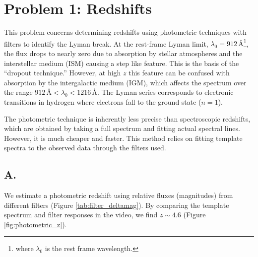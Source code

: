 
\section*{Problem 1: Redshifts}
This problem concerns determining redshifts using photometric techniques with filters to identify the Lyman break. At the rest-frame Lyman limit, $\lambda_0 = 912 \, \text{\AA}$\footnote{where $\lambda_0$ is the rest frame wavelength.}, the flux drops to nearly zero due to absorption by stellar atmospheres and the interstellar medium (ISM) causing a step like feature. This is the basis of the ``dropout technique.'' However, at high $z$ this feature can be confused with absorption by the intergalactic medium (IGM), which affects the spectrum over the range $912 \, \text{\AA} < \lambda_0 < 1216 \, \text{\AA}$. The Lyman series corresponds to electronic transitions in hydrogen where electrons fall to the ground state ($n=1$). 

The photometric technique is inherently less precise than spectroscopic redshifts, which are obtained by taking a full spectrum and fitting actual spectral lines. However, it is much cheaper and faster. This method relies on fitting template spectra to the observed data through the filters used.

\subsection*{A.}
We estimate a photometric redshift using relative fluxes (magnitudes) from different filters (Figure \ref{tab:filter_deltamag}). By comparing the template spectrum and filter responses in the video, we find $z \sim 4.6$ (Figure \ref{fig:photometric_z}).

